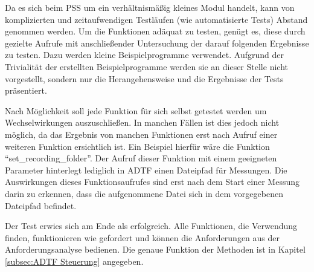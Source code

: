\documentclass[12pt,a4paper]{report}
\begin{document}
Da es sich beim PSS um ein verhältnismäßig kleines Modul handelt, kann von komplizierten und zeitaufwendigen Testläufen (wie automatisierte Tests) Abstand genommen werden. Um die Funktionen adäquat zu testen, genügt es, diese durch gezielte Aufrufe mit anschließender Untersuchung der darauf folgenden Ergebnisse zu testen. Dazu werden kleine Beispielprogramme verwendet. Aufgrund der Trivialität der erstellten Beispielprogramme werden sie an dieser Stelle nicht vorgestellt, sondern nur die Herangehensweise und die Ergebnisse der Tests präsentiert. 

Nach Möglichkeit soll jede Funktion für sich selbst getestet werden um Wechselwirkungen auszuschließen. In manchen Fällen ist dies jedoch nicht möglich, da das Ergebnis von manchen Funktionen erst nach Aufruf einer weiteren Funktion ersichtlich ist. Ein Beispiel hierfür wäre die Funktion "`set\_recording\_folder"'. Der Aufruf dieser Funktion mit einem geeigneten Parameter hinterlegt lediglich in ADTF einen Dateipfad für Messungen. Die Auswirkungen dieses Funktionsaufrufes sind erst nach dem Start einer Messung darin zu erkennen, dass die aufgenommene Datei sich in dem vorgegebenen Dateipfad befindet.

Der Test erwies sich am Ende als erfolgreich. Alle Funktionen, die Verwendung finden, funktionieren wie gefordert und können die Anforderungen aus der Anforderungsanalyse bedienen. Die genaue Funktion der Methoden ist in Kapitel \ref{subsec:ADTF Steuerung} angegeben.
\end{document}
